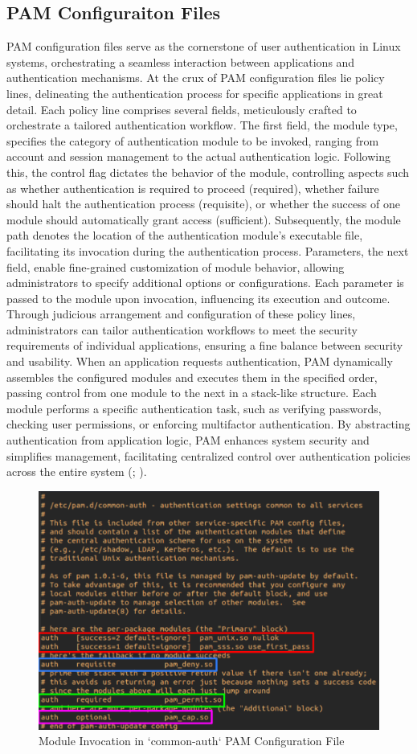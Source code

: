 \documentclass[
]{article}
\begin{document}
\begin{multicols}{2}

\section{PAM Configuraiton Files}
PAM configuration files serve as the cornerstone of user authentication in Linux systems, orchestrating a seamless interaction between applications and authentication mechanisms. At the crux of PAM configuration files lie policy lines, delineating the authentication process for specific applications in great detail. Each policy line comprises several fields, meticulously crafted to orchestrate a tailored authentication workflow. The first field, the module type, specifies the category of authentication module to be invoked, ranging from account and session management to the actual authentication logic. Following this, the control flag dictates the behavior of the module, controlling aspects such as whether authentication is required to proceed (required), whether failure should halt the authentication process (requisite), or whether the success of one module should automatically grant access (sufficient). Subsequently, the module path denotes the location of the authentication module's executable file, facilitating its invocation during the authentication process. Parameters, the next field, enable fine-grained customization of module behavior, allowing administrators to specify additional options or configurations. Each parameter is passed to the module upon invocation, influencing its execution and outcome. Through judicious arrangement and configuration of these policy lines, administrators can tailor authentication workflows to meet the security requirements of individual applications, ensuring a fine balance between security and usability. When an application requests authentication, PAM dynamically assembles the configured modules and executes them in the specified order, passing control from one module to the next in a stack-like structure. Each module performs a specific authentication task, such as verifying passwords, checking user permissions, or enforcing multifactor authentication. By abstracting authentication from application logic, PAM enhances system security and simplifies management, facilitating centralized control over authentication policies across the entire system (\cite{stallings2020}; \cite{love2010}).

\end{multicols}

\begin{figure}[htbp]
  \centering
  \includegraphics[width=0.4\linewidth]{images/common-auth.png}
  \caption{Module Invocation in `common-auth` PAM Configuration File}
\end{figure}



\end{document}
